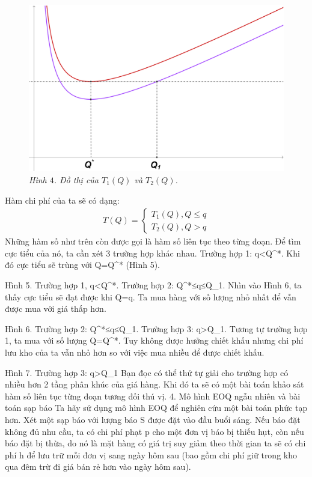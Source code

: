 \begin{multicols}{2}
	\begin{figure}[H]
		\vspace*{-5pt}
		\centering
		\captionsetup{labelformat= empty, justification=centering}
		\includegraphics[width= 1\linewidth]{5}
		\caption{\small\textit{\color{toanhocdoisong}Hình $4$. Đồ thị của $T_1(Q)$ và $T_2(Q)$.}}
		\vspace*{-10pt}
	\end{figure}
	Hàm chi phí của ta sẽ có dạng:
	\begin{align*}
		T(Q) = \begin{cases}
			T_1(Q),Q \le q\\
			T_2(Q),Q > q
		\end{cases}
	\end{align*}
	Những hàm số như trên còn được gọi là hàm số liên tục theo từng đoạn. Để tìm cực tiểu của nó, ta cần xét 3 trường hợp khác nhau.
	Trường hợp 1: q<Q^*.  Khi đó cực tiểu sẽ trùng với Q=Q^* (Hình 5).
	
	
	Hình 5. Trường hợp 1, q<Q^*.
	Trường hợp 2: Q^*≤q≤Q_1. Nhìn vào Hình 6, ta thấy cực tiểu sẽ đạt được khi Q=q. Ta mua hàng với số lượng nhỏ nhất để vẫn được mua với giá thấp hơn.
	
	Hình 6. Trường hợp 2: Q^*≤q≤Q_1.
	Trường hợp 3: q>Q_1. Tương tự trường hợp 1, ta mua với số lượng Q=Q^*. Tuy không được hưởng chiết khấu nhưng chi phí lưu kho của ta vẫn nhỏ hơn so với việc mua nhiều để được chiết khấu.
	
	Hình 7. Trường hợp 3: q>Q_1
	Bạn đọc có thể thử tự giải cho trường hợp có nhiều hơn 2 tầng phân khúc của giá hàng. Khi đó ta sẽ có một bài toán khảo sát hàm số liên tục từng đoạn tương đối thú vị.
	4. Mô hình EOQ ngẫu nhiên và bài toán sạp báo
	Ta hãy sử dụng mô hình EOQ để nghiên cứu một bài toán phức tạp hơn. Xét một sạp báo với lượng báo S được đặt vào đầu buổi sáng. Nếu báo đặt không đủ nhu cầu, ta có chi phí phạt p cho một đơn vị báo bị thiếu hụt, còn nếu báo đặt bị thừa, do nó là mặt hàng có giá trị suy giảm theo thời gian ta sẽ có chi phí h để lưu trữ mỗi đơn vị sang ngày hôm sau (bao gồm chi phí giữ trong kho qua đêm trừ đi giá bán rẻ hơn vào ngày hôm sau).
	

\end{multicols}
